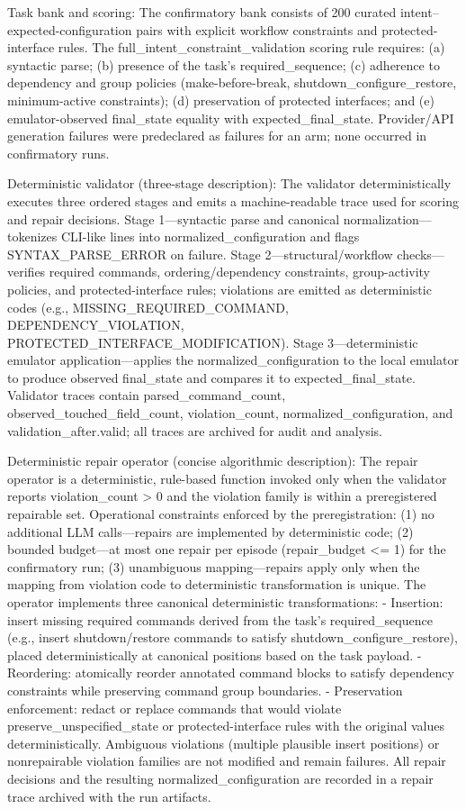 \documentclass[conference]{IEEEtran}
\begin{document}
Task bank and scoring: The confirmatory bank consists of 200 curated intent--expected-configuration pairs with explicit workflow constraints and protected-interface rules. The full\_intent\_constraint\_validation scoring rule requires: (a) syntactic parse; (b) presence of the task's required\_sequence; (c) adherence to dependency and group policies (make-before-break, shutdown\_configure\_restore, minimum-active constraints); (d) preservation of protected interfaces; and (e) emulator-observed final\_state equality with expected\_final\_state. Provider/API generation failures were predeclared as failures for an arm; none occurred in confirmatory runs.

Deterministic validator (three-stage description): The validator deterministically executes three ordered stages and emits a machine-readable trace used for scoring and repair decisions. Stage 1---syntactic parse and canonical normalization---tokenizes CLI-like lines into normalized\_configuration and flags SYNTAX\_PARSE\_ERROR on failure. Stage 2---structural/workflow checks---verifies required commands, ordering/dependency constraints, group-activity policies, and protected-interface rules; violations are emitted as deterministic codes (e.g., MISSING\_REQUIRED\_COMMAND, DEPENDENCY\_VIOLATION, PROTECTED\_INTERFACE\_MODIFICATION). Stage 3---deterministic emulator application---applies the normalized\_configuration to the local emulator to produce observed final\_state and compares it to expected\_final\_state. Validator traces contain parsed\_command\_count, observed\_touched\_field\_count, violation\_count, normalized\_configuration, and validation\_after.valid; all traces are archived for audit and analysis.

Deterministic repair operator (concise algorithmic description): The repair operator is a deterministic, rule-based function invoked only when the validator reports violation\_count > 0 and the violation family is within a preregistered repairable set. Operational constraints enforced by the preregistration: (1) no additional LLM calls---repairs are implemented by deterministic code; (2) bounded budget---at most one repair per episode (repair\_budget <= 1) for the confirmatory run; (3) unambiguous mapping---repairs apply only when the mapping from violation code to deterministic transformation is unique. The operator implements three canonical deterministic transformations:
- Insertion: insert missing required commands derived from the task's required\_sequence (e.g., insert shutdown/restore commands to satisfy shutdown\_configure\_restore), placed deterministically at canonical positions based on the task payload.
- Reordering: atomically reorder annotated command blocks to satisfy dependency constraints while preserving command group boundaries.
- Preservation enforcement: redact or replace commands that would violate preserve\_unspecified\_state or protected-interface rules with the original values deterministically.
Ambiguous violations (multiple plausible insert positions) or nonrepairable violation families are not modified and remain failures. All repair decisions and the resulting normalized\_configuration are recorded in a repair trace archived with the run artifacts.
\end{document}
